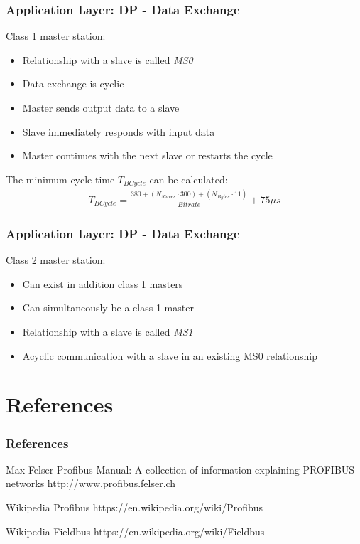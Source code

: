\documentclass{beamer}
\begin{document}
\begin{frame}
  \frametitle{Application Layer: DP - Data Exchange}
  Class 1 master station:
  \begin{itemize}
    \item Relationship with a slave is called \textit{MS0}
    \item Data exchange is cyclic
    \item Master sends output data to a slave
    \item Slave immediately responds with input data
    \item Master continues with the next slave or restarts the cycle
  \end{itemize}
  \vspace{10pt}
  The minimum cycle time $T_{BCycle}$ can be calculated:
  \begin{align*}
    T_{BCycle} = \frac{380 + (N_{Slaves} \cdot 300) + (N_{Bytes} \cdot 11)}{Bitrate} + 75
    \mu s
    \label{minimumcycletime}
  \end{align*}
\end{frame}

\begin{frame}
  \frametitle{Application Layer: DP - Data Exchange}
  Class 2 master station:
  \begin{itemize}
    \item Can exist in addition class 1 masters
    \item Can simultaneously be a class 1 master
    \item Relationship with a slave is called \textit{MS1}
    \item Acyclic communication with a slave in an existing MS0 relationship
  \end{itemize}
\end{frame}

\section*{References}
\begin{frame}[allowframebreaks]
  \frametitle{References}
  \begin{thebibliography}{10}
  \beamertemplatebookbibitems
    Max Felser
    \newblock Profibus Manual: A collection of information explaining PROFIBUS networks
    \newblock http://www.profibus.felser.ch

    Wikipedia
    \newblock Profibus
    \newblock https://en.wikipedia.org/wiki/Profibus

    Wikipedia
    \newblock Fieldbus
    \newblock https://en.wikipedia.org/wiki/Fieldbus
   \end{thebibliography}
 \end{frame}
\end{document}
